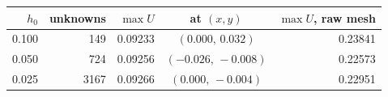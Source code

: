 \begin{tabular}{@{}rrrcr@{}}
\toprule
$h_0$ & unknowns & $\max U$ & at $(x,y)$ & $\max U$, raw mesh\\
\midrule
0.100 & 149 & 0.09233 & $(0.000,\,0.032)$ & 0.23841\\
0.050 & 724 & 0.09256 & $(-0.026,\,-0.008)$ & 0.22573\\
0.025 & 3167 & 0.09266 & $(0.000,\,-0.004)$ & 0.22951\\
\bottomrule
\end{tabular}
